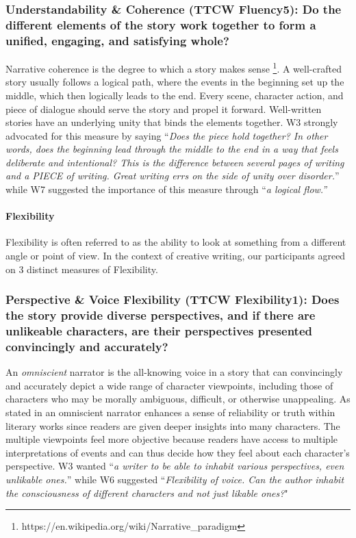 \subsubsection{\textbf{{\color{blue}Understandability \& Coherence (TTCW Fluency5)}: Do the different elements of the story work together to form a unified, engaging, and satisfying whole?}} Narrative coherence is the degree to which a story makes sense  \footnote{https://en.wikipedia.org/wiki/Narrative\_paradigm}. A well-crafted story usually follows a logical path, where the events in the beginning set up the middle, which then logically leads to the end. Every scene, character action, and piece of dialogue should serve the story and propel it forward. Well-written stories have an underlying unity that binds the elements together. W3 strongly advocated for this measure by saying ``\textit{Does the piece hold together? In other words, does the beginning lead through the middle to the end in a way that feels deliberate and intentional? This is the difference between several pages of writing and a PIECE of writing. Great writing errs on the side of unity over disorder.}'' while W7 suggested the importance of this measure through ``\textit{a logical flow.''}

\paragraph{\textbf{Flexibility}} Flexibility is often referred to as the ability to look at something from a different angle or point of view. In the context of creative writing, our participants agreed on 3 distinct measures of Flexibility.
\subsubsection{\textbf{{\color{blue}Perspective \& Voice Flexibility (TTCW Flexibility1)}: Does the story provide diverse perspectives, and if there are unlikeable characters, are their perspectives presented convincingly and accurately?}} An \textit{omniscient} narrator is the all-knowing voice in a story that can convincingly and accurately depict a wide range of character viewpoints, including those of characters who may be morally ambiguous, difficult, or otherwise unappealing. As stated in \citet{friedman1955point} an omniscient narrator enhances a sense of reliability or truth within literary works since readers are given deeper insights into many characters. The multiple viewpoints feel more objective because readers have access to multiple interpretations of events and can thus decide how they feel about each character’s perspective. W3 wanted ``\textit{a writer to be able to inhabit various perspectives, even unlikable ones.}'' while W6 suggested ``\textit{Flexibility of voice. Can the author inhabit the consciousness of different characters and not just likable ones?}"
